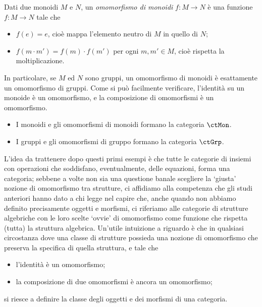 \begin{example}\label{ex_cat_monoidi}
	Dati due monoidi \(M\) e \(N\), un \emph{omomorfismo di monoidi} \(f:M\to N\) è una funzione \(f:M\to N\) tale che
	\begin{itemize}
		\item \(f(e) = e\), cioè mappa l'elemento neutro di \(M\) in quello di \(N\);
		\item \(f(m\cdot m')=f(m)\cdot f(m')\) per ogni \(m,m'\in M\), cioè rispetta la moltiplicazione.
	\end{itemize}
	In particolare, se \(M\) ed \(N\) sono gruppi, un omomorfismo di monoidi è esattamente un omomorfismo di gruppi.
	Come si può facilmente verificare, l'identità su un monoide è un omomorfismo, e la composizione di omomorfismi è un omomorfismo.
	\begin{itemize}
		\item I monoidi e gli omomorfismi di monoidi formano la categoria \(\ctMon\).
		\item I gruppi e gli omomorfismi di gruppo formano la categoria \(\ctGrp\).
	\end{itemize}
\end{example}
L'idea da trattenere dopo questi primi esempi è che tutte le categorie di insiemi con operazioni che soddisfano, eventualmente, delle equazioni, forma una categoria; sebbene a volte non sia una questione banale scegliere la `giusta' nozione di omomorfismo tra strutture, ci affidiamo alla competenza che gli studi anteriori hanno dato a chi legge nel capire che, anche quando non abbiamo definito precisamente oggetti e morfismi, ci riferiamo alle categorie di strutture algebriche con le loro scelte `ovvie' di omomorfismo come funzione che rispetta (tutta) la struttura algebrica. Un'utile intuizione a riguardo è che in qualsiasi circostanza dove una classe di strutture possieda una nozione di omomorfismo che preserva la specifica di quella struttura, e tale che
\begin{itemize}
	\item l'identità è un omomorfismo;
	\item la composizione di due omomorfismi è ancora un omomorfismo;
\end{itemize}
si riesce a definire la classe degli oggetti e dei morfismi di una categoria.


